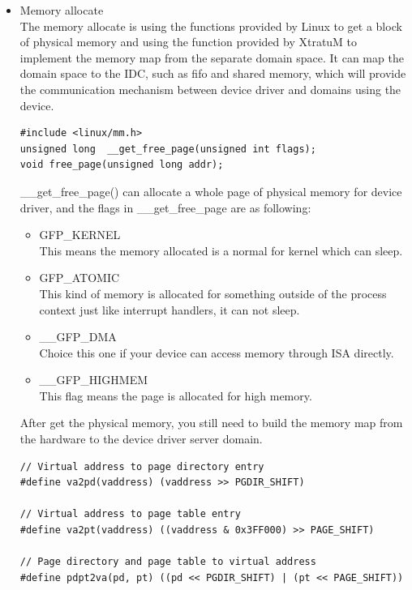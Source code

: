 \begin{itemize}
\begin{itemize}
\item{Memory allocate}\\
The memory allocate is using the functions provided by Linux to get a block of physical memory and using the function provided by XtratuM to implement the memory map from the separate domain space. It can map the domain space to the IDC, such as fifo and shared memory, which will provide the communication mechanism between device driver and domains using the device. \\
\begin{verbatim}
#include <linux/mm.h>
unsigned long  __get_free_page(unsigned int flags);
void free_page(unsigned long addr);
\end{verbatim}
\_\_get\_free\_page() can allocate a whole page of physical memory for device driver, and the flags in \_\_get\_free\_page are as following:\\
\begin{itemize}
\item{GFP\_KERNEL}\\
This means the memory allocated is a normal for kernel which can sleep.\\

\item{GFP\_ATOMIC}\\
This kind of memory is allocated for something outside of the process context just like interrupt handlers, it can not sleep.\\

\item{\_\_GFP\_DMA}\\
Choice this one if your device can access memory through ISA directly.\\

\item{\_\_GFP\_HIGHMEM}\\
This flag means the page is allocated for high memory.\\
\end{itemize}
After get the physical memory, you still need to build the memory map from the hardware to the device driver server domain. 
\begin{verbatim}
// Virtual address to page directory entry
#define va2pd(vaddress) (vaddress >> PGDIR_SHIFT)

// Virtual address to page table entry
#define va2pt(vaddress) ((vaddress & 0x3FF000) >> PAGE_SHIFT)

// Page directory and page table to virtual address
#define pdpt2va(pd, pt) ((pd << PGDIR_SHIFT) | (pt << PAGE_SHIFT))
\end{verbatim}


\end{itemize}
\end{itemize}
